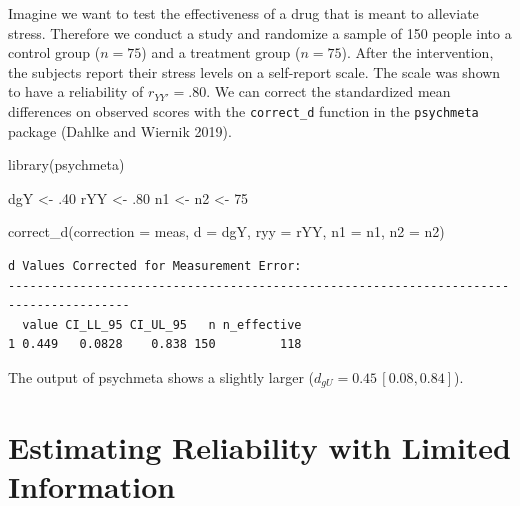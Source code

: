 \documentclass[
  letterpaper,
  DIV=11,
  numbers=noendperiod]{scrreprt}
\newenvironment{Shaded}{}{}
\newcommand{\AttributeTok}[1]{\textcolor[rgb]{0.00,0.34,0.68}{#1}}
\newcommand{\DecValTok}[1]{\textcolor[rgb]{0.69,0.50,0.00}{#1}}
\newcommand{\FunctionTok}[1]{\textcolor[rgb]{0.39,0.29,0.61}{#1}}
\newcommand{\NormalTok}[1]{\textcolor[rgb]{0.12,0.11,0.11}{#1}}
\newcommand{\OtherTok}[1]{\textcolor[rgb]{0.00,0.43,0.16}{#1}}
\newcommand{\StringTok}[1]{\textcolor[rgb]{0.75,0.01,0.01}{#1}}
\begin{document}
\begin{tcolorbox}[enhanced jigsaw, opacityback=0, coltitle=black, toprule=.15mm, colframe=quarto-callout-note-color-frame, bottomtitle=1mm, rightrule=.15mm, colbacktitle=quarto-callout-note-color!10!white, left=2mm, bottomrule=.15mm, breakable, title={Applied Example in R}, colback=white, opacitybacktitle=0.6, titlerule=0mm, arc=.35mm, leftrule=.75mm, toptitle=1mm]

Imagine we want to test the effectiveness of a drug that is meant to
alleviate stress. Therefore we conduct a study and randomize a sample of
150 people into a control group (\(n=75\)) and a treatment group
(\(n=75\)). After the intervention, the subjects report their stress
levels on a self-report scale. The scale was shown to have a reliability
of \(r_{YY'}=.80\). We can correct the standardized mean differences on
observed scores with the \texttt{correct\_d} function in the
\texttt{psychmeta} package (Dahlke and Wiernik 2019).

\begin{Shaded}
\begin{Highlighting}[]
\FunctionTok{library}\NormalTok{(psychmeta)}

\NormalTok{dgY }\OtherTok{\textless{}{-}}\NormalTok{ .}\DecValTok{40}
\NormalTok{rYY }\OtherTok{\textless{}{-}}\NormalTok{ .}\DecValTok{80}
\NormalTok{n1 }\OtherTok{\textless{}{-}}\NormalTok{ n2 }\OtherTok{\textless{}{-}} \DecValTok{75}

\FunctionTok{correct\_d}\NormalTok{(}\AttributeTok{correction =} \StringTok{\textquotesingle{}meas\textquotesingle{}}\NormalTok{,}
          \AttributeTok{d =}\NormalTok{ dgY,}
          \AttributeTok{ryy =}\NormalTok{ rYY,}
          \AttributeTok{n1 =}\NormalTok{ n1,}
          \AttributeTok{n2 =}\NormalTok{ n2)}
\end{Highlighting}
\end{Shaded}

\begin{verbatim}
d Values Corrected for Measurement Error:
---------------------------------------------------------------------------------------
  value CI_LL_95 CI_UL_95   n n_effective
1 0.449   0.0828    0.838 150         118
\end{verbatim}

The output of psychmeta shows a slightly larger
(\(d_{gU} = 0.45\,[0.08,0.84]\)).

\end{tcolorbox}

\section{Estimating Reliability with Limited
Information}\label{sec-lim-information}
\end{document}
